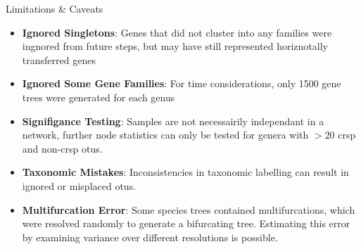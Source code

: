 \documentclass[dvipsnames]{beamer}
\begin{document}
\begin{frame}[fragile]{Limitations \& Caveats}
    \begin{itemize}
        \item<2-> \textbf{Ignored Singletons}: Genes that did not cluster into any families were ingnored from future steps, but may have still represented horiznotally transferred genes
        \item<3-> \textbf{Ignored Some Gene Families}: For time considerations, only 1500 gene trees were generated for each genus
        \item<4-> \textbf{Signifigance Testing}: Samples are not necessairily independant in a network, further node statistics can only be tested for genera with $> 20$ \ac{crsp} and non-\ac{crsp} \ac{otu}s.
        \item<5-> \textbf{Taxonomic Mistakes}: Inconsistencies in taxonomic labelling can result in ignored or misplaced \ac{otu}s.
        \item<6-> \textbf{Multifurcation Error}: Some species trees contained multifurcations, which were resolved randomly to generate a bifurcating tree. Estimating this error by examining variance over different resolutions is possible.
    \end{itemize}
\end{frame}
\end{document}
